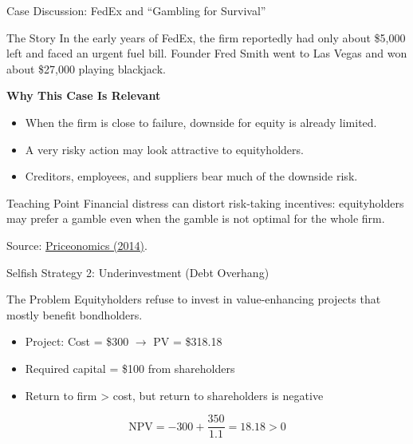 \begin{frame}{Case Discussion: FedEx and ``Gambling for Survival''}

\begin{block}{The Story}
In the early years of FedEx, the firm reportedly had only about \$5,000 left
and faced an urgent fuel bill. Founder Fred Smith went to Las Vegas and
won about \$27,000 playing blackjack.
\end{block}

\vspace{0.2cm}

\textbf{Why This Case Is Relevant}
\begin{itemize}
    \item When the firm is close to failure, downside for equity is already limited.
    \item A very risky action may look attractive to equityholders.
    \item Creditors, employees, and suppliers bear much of the downside risk.
\end{itemize}

\vfill

\begin{alertblock}{Teaching Point}
Financial distress can distort risk-taking incentives: equityholders may
prefer a gamble even when the gamble is not optimal for the whole firm.
\end{alertblock}

{\scriptsize Source: \href{https://priceonomics.com/how-a-lucky-run-in-vegas-saved-fedex/}{Priceonomics (2014)}.}
\end{frame}

\begin{frame}{Selfish Strategy 2: Underinvestment (Debt Overhang)}
	
	\begin{block}{The Problem}
		Equityholders refuse to invest in value-enhancing projects that mostly benefit bondholders.
	\end{block}
	
	\begin{itemize}
		\item Project: Cost = \$300 $\rightarrow$ PV = \$318.18
		\item Required capital = \$100 from shareholders
		\item Return to firm > cost, but return to shareholders is negative
	\end{itemize}
	
	\begin{equation*}
		\text{NPV} = -300 + \frac{350}{1.1} = 18.18 > 0
	\end{equation*}
	
\end{frame}

